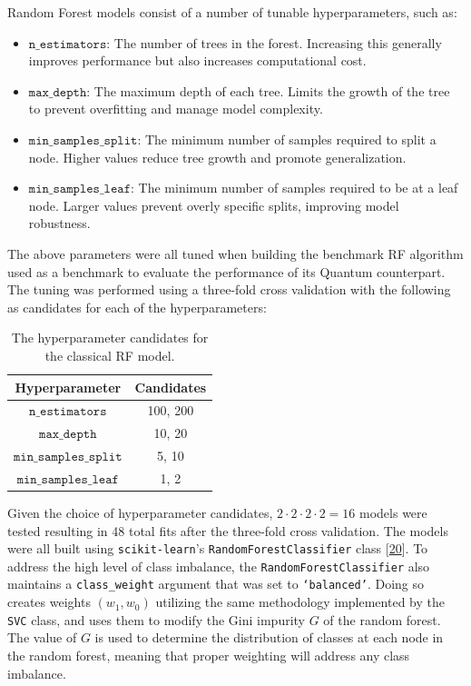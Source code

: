 \documentclass[11pt, oneside]{article}   	%
\begin{document}
Random Forest models consist of a number of tunable hyperparameters, such as:

\begin{itemize}
    \item $\texttt{n\_estimators}$: The number of trees in the forest. Increasing this generally improves performance but also increases computational cost.
    \item $\texttt{max\_depth}$: The maximum depth of each tree. Limits the growth of the tree to prevent overfitting and manage model complexity.
    \item $\texttt{min\_samples\_split}$: The minimum number of samples required to split a node. Higher values reduce tree growth and promote generalization.
    \item $\texttt{min\_samples\_leaf}$: The minimum number of samples required to be at a leaf node. Larger values prevent overly specific splits, improving model robustness.
\end{itemize}

The above parameters were all tuned when building the benchmark RF algorithm used as a benchmark to evaluate the performance of its Quantum counterpart. The tuning was performed using a three-fold cross validation with the following as candidates for each of the hyperparameters:

\begin{table}[h!]
    \centering
    \begin{tabular}{|c|c|}
        \hline
        \textbf{Hyperparameter} & \textbf{Candidates} \\ \hline
        $\texttt{n\_estimators}$ &  100, 200 \\ \hline
        $\texttt{max\_depth}$ & 10, 20 \\ \hline
        $\texttt{min\_samples\_split}$ & 5, 10 \\ \hline
        $\texttt{min\_samples\_leaf}$ & 1, 2 \\ \hline
    \end{tabular}
    \caption{The hyperparameter candidates for the classical RF model.}
    \label{tab2}
\end{table}

Given the choice of hyperparameter candidates, $2\cdot 2\cdot 2 \cdot 2 = 16$ models were tested resulting in 48 total fits after the three-fold cross validation. The models were all built using \texttt{scikit-learn}'s \texttt{RandomForestClassifier} class  [\href{https://www.nature.com/articles/s41592-019-0686-2}{20}]. To address the high level of class imbalance, the \texttt{RandomForestClassifier} also maintains a \texttt{class\_weight} argument that was set to \texttt{`balanced'}. Doing so creates weights $(w_1, w_0)$ utilizing the same methodology implemented by the \texttt{SVC} class, and uses them to modify the Gini impurity $G$ of the random forest. The value of $G$ is used to determine the distribution of classes at each node in the random forest, meaning that proper weighting will address any class imbalance. \\
\end{document}
